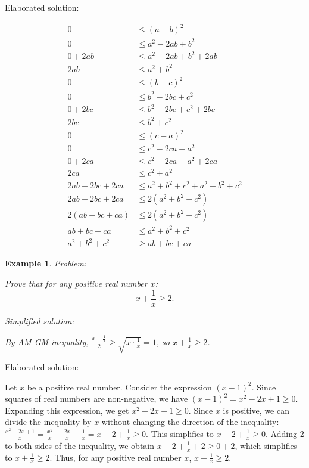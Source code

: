 \documentclass{article}
\newtheorem{example}{Example}
\begin{document}
Elaborated solution:
\begin{tcolorbox}[colback=green!10, width=\linewidth]
\begin{align*} 0 &\leq (a-b)^2 \\ 0 &\leq a^2 - 2ab + b^2 \\ 0 + 2ab &\leq a^2 - 2ab + b^2 + 2ab \\ 2ab &\leq a^2 + b^2 \\ 0 &\leq (b-c)^2 \\ 0 &\leq b^2 - 2bc + c^2 \\ 0 + 2bc &\leq b^2 - 2bc + c^2 + 2bc \\ 2bc &\leq b^2 + c^2 \\ 0 &\leq (c-a)^2 \\ 0 &\leq c^2 - 2ca + a^2 \\ 0 + 2ca &\leq c^2 - 2ca + a^2 + 2ca \\ 2ca &\leq c^2 + a^2 \\ 2ab + 2bc + 2ca &\leq a^2 + b^2 + c^2 + a^2 + b^2 + c^2 \\ 2ab + 2bc + 2ca &\leq 2(a^2 + b^2 + c^2) \\ 2(ab + bc + ca) &\leq 2(a^2 + b^2 + c^2) \\ ab + bc + ca &\leq a^2 + b^2 + c^2 \\ a^2 + b^2 + c^2 &\geq ab + bc + ca\end{align*} 

\end{tcolorbox}



\begin{example}
Problem:
\begin{tcolorbox}[colback=yellow!10, width=\linewidth]
Prove that for any positive real number $x$:
    $$x + \frac{1}{x} \geq 2.$$
\end{tcolorbox}

Simplified solution:
\begin{tcolorbox}[colback=blue!10, width=\linewidth]
By AM-GM inequality, $\frac{x + \frac{1}{x}}{2} \ge \sqrt{x \cdot \frac{1}{x}} = 1$, so $x + \frac{1}{x} \ge 2$.

\end{tcolorbox}
\end{example}

Elaborated solution:
\begin{tcolorbox}[colback=green!10, width=\linewidth]
Let $x$ be a positive real number.
Consider the expression $(x-1)^2$. Since squares of real numbers are non-negative, we have $(x-1)^2 = x^2 - 2x + 1 \geq 0$.
Expanding this expression, we get $x^2 - 2x + 1 \geq 0$. Since $x$ is positive, we can divide the inequality by $x$ without changing the direction of the inequality: $\frac{x^2 - 2x + 1}{x} = \frac{x^2}{x} - \frac{2x}{x} + \frac{1}{x} = x - 2 + \frac{1}{x} \geq 0$.
This simplifies to $x - 2 + \frac{1}{x} \geq 0$.
Adding 2 to both sides of the inequality, we obtain $x - 2 + \frac{1}{x} + 2 \geq 0 + 2$, which simplifies to $x + \frac{1}{x} \geq 2$.
Thus, for any positive real number $x$, $x + \frac{1}{x} \geq 2$.

\end{tcolorbox}
\end{document}
